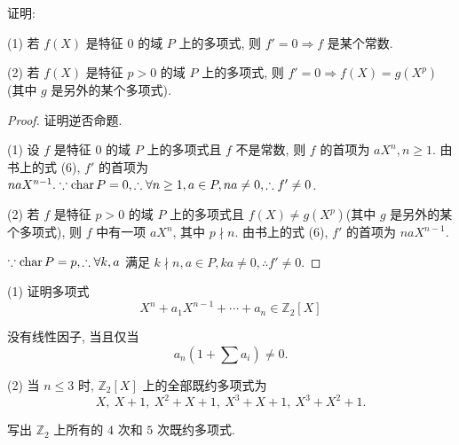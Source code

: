 \documentclass[UTF8]{ctexart}
\begin{document}
\begin{exercise}%
    证明:
    
    (1) 若 $f(X)$ 是特征 $0$ 的域 $P$ 上的多项式, 则 $f'=0\Rightarrow f$ 是某个常数.
    
    (2) 若 $f(X)$ 是特征 $p>0$ 的域 $P$ 上的多项式, 则 $f'=0\Rightarrow f(X)=g(X^p)$(其中 $g$ 是另外的某个多项式).
\end{exercise}
\begin{proof}
    证明逆否命题.

    (1) 设 $f$ 是特征 $0$ 的域 $P$ 上的多项式且 $f$ 不是常数, 则 $f$ 的首项为 $aX^n,n\geq1$. 由书上的式 (6), $f'$ 的首项为 $naX^{n-1}.\because\operatorname{char} P=0,\therefore\forall n\geq1,a\in P,na\neq0,\therefore f'\neq0$.

    (2) 若 $f$ 是特征 $p>0$ 的域 $P$ 上的多项式且 $f(X)\neq g(X^p)$(其中 $g$ 是另外的某个多项式), 则 $f$ 中有一项 $aX^n$, 其中 $p\nmid n$. 由书上的式 (6), $f'$ 的首项为 $naX^{n-1}$.
    
    $\because\operatorname{char} P=p,\therefore\forall k,a$ 满足 $k\nmid n,a\in P,ka\neq0,\therefore f'\neq0$.
\end{proof}
\addtocounter{exercise}{2}
\begin{exercise}%
    (1) 证明多项式
    \begin{equation}\label{eq5.1}
        X^n+a_1X^{n-1}+\cdots+a_n\in\mathbb{Z}_2[X]
    \end{equation}

    没有线性因子, 当且仅当
    \[a_n(1+\sum a_i)\neq0.\]

    (2) 当 $n\leq3$ 时, $\mathbb{Z}_2[X]$ 上的全部既约多项式为
    \[X,\ X+1,\ X^2+X+1,\ X^3+X+1,\ X^3+X^2+1.\]

    写出 $\mathbb{Z}_2$ 上所有的 $4$ 次和 $5$ 次既约多项式.
\end{exercise}
\end{document}
